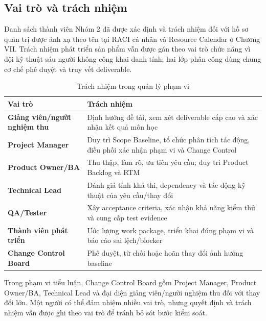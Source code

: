 
\subsection{Vai trò và trách nhiệm}

Danh sách thành viên Nhóm 2 đã được xác định và trách nhiệm đối với hồ sơ quản trị được ánh xạ theo tên tại RACI cá nhân và Resource Calendar ở Chương VII. Trách nhiệm phát triển sản phẩm vẫn được gán theo vai trò chức năng vì đội kỹ thuật sáu người không công khai danh tính; hai lớp phân công dùng chung cơ chế phê duyệt và truy vết deliverable.

\begin{table}[H]
\centering
\caption{Trách nhiệm trong quản lý phạm vi}
\label{tab:scope-responsibility}
\begin{tabularx}{\textwidth}{| >{\bfseries}p{3.5cm} | X |}
\hline
Vai trò & Trách nhiệm \\
\hline
Giảng viên/người nghiệm thu & Định hướng đề tài, xem xét deliverable cấp cao và xác nhận kết quả môn học \\ \hline
Project Manager & Duy trì Scope Baseline, tổ chức phân tích tác động, điều phối xác nhận phạm vi và Change Control \\ \hline
Product Owner/BA & Thu thập, làm rõ, ưu tiên yêu cầu; duy trì Product Backlog và RTM \\ \hline
Technical Lead & Đánh giá tính khả thi, dependency và tác động kỹ thuật của yêu cầu/thay đổi \\ \hline
QA/Tester & Xây acceptance criteria, xác nhận khả năng kiểm thử và cung cấp test evidence \\ \hline
Thành viên phát triển & Ước lượng work package, triển khai đúng phạm vi và báo cáo sai lệch/blocker \\ \hline
Change Control Board & Phê duyệt, từ chối hoặc hoãn thay đổi ảnh hưởng baseline \\
\hline
\end{tabularx}
\end{table}

Trong phạm vi tiểu luận, Change Control Board gồm Project Manager, Product Owner/BA, Technical Lead và đại diện giảng viên/người nghiệm thu đối với thay đổi lớn. Một người có thể đảm nhiệm nhiều vai trò, nhưng quyết định và trách nhiệm vẫn được ghi theo vai trò để tránh bỏ sót bước kiểm soát.

